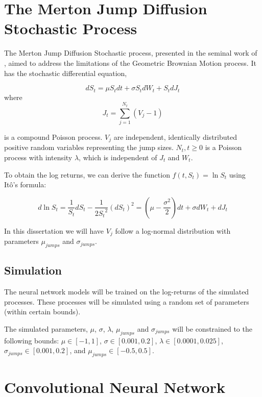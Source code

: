 \documentclass[11pt,oneside,openany,a4paper,english, report, goldenblock
]{usthesis}
\begin{document}
\section{The Merton Jump Diffusion Stochastic Process}

The Merton Jump Diffusion Stochastic process, presented in the seminal work of \citet{Merton}, aimed to address the limitations of the Geometric Brownian Motion process. It has the stochastic differential equation,

\begin{equation}
d S_t =  \mu S_t dt  +\sigma S_t dW_t + S_t dJ_t 
\end{equation}
where
\begin{equation}
J_t = \sum_{j=1}^{N_t}(V_j - 1)
\end{equation}

is a compound Poisson process. $V_j$ are independent, identically distributed positive random variables representing the jump sizes. $N_t, t \geq 0$ is a Poisson process with intensity $\lambda$, which is independent of $J_t$ and $W_t$.

To obtain the log returns, we can derive the function $f(t, S_t) = \ln{S_t}$ using It\^{o}'s formula:

\begin{equation}
d\ln{S_t} = \frac{1}{S_t}dS_t - \frac{1}{2{S_t}^2}\left(dS_t\right)^2 = \left( \mu - \frac{\sigma^2}{2} \right)dt +\sigma dW_t + dJ_t 
\end{equation}

In this dissertation we will have $V_j$ follow a log-normal distribution with parameters $\mu_{jumps}$ and $\sigma_{jumps}$.

\subsection{Simulation}
The neural network models will be trained on the log-returns of the simulated processes. These processes will be simulated using a random set of parameters (within certain bounds).

The simulated parameters, $\mu$, $\sigma$, $\lambda$, $\mu_{jumps}$ and $\sigma_{jumps}$ will be constrained to the following bounds: $\mu \in [-1, 1]$, $\sigma \in [0.001, 0.2]$, $\lambda\in [0.0001, 0.025]$, $\sigma_{jumps} \in [0.001, 0.2]$, and $\mu_{jumps}\in [-0.5, 0.5]$.

\section{Convolutional Neural Network}
\end{document}

